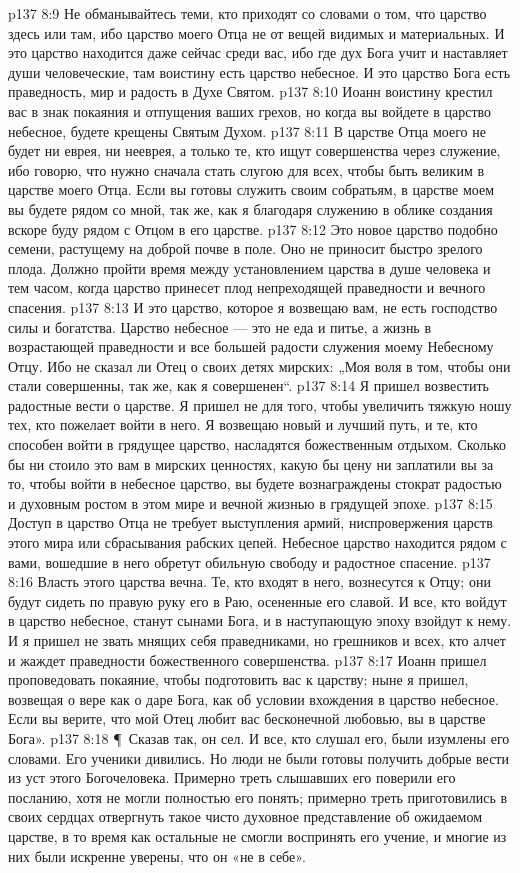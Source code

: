 \vs p137 8:9 Не обманывайтесь теми, кто приходят со словами о том, что царство здесь или там, ибо царство моего Отца не от вещей видимых и материальных. И это царство находится даже сейчас среди вас, ибо где дух Бога учит и наставляет души человеческие, там воистину есть царство небесное. И это царство Бога есть праведность, мир и радость в Духе Святом.
\vs p137 8:10 Иоанн воистину крестил вас в знак покаяния и отпущения ваших грехов, но когда вы войдете в царство небесное, будете крещены Святым Духом.
\vs p137 8:11 В царстве Отца моего не будет ни еврея, ни нееврея, а только те, кто ищут совершенства через служение, ибо говорю, что нужно сначала стать слугою для всех, чтобы быть великим в царстве моего Отца. Если вы готовы служить своим собратьям, в царстве моем вы будете рядом со мной, так же, как я благодаря служению в облике создания вскоре буду рядом с Отцом в его царстве.
\vs p137 8:12 Это новое царство подобно семени, растущему на доброй почве в поле. Оно не приносит быстро зрелого плода. Должно пройти время между установлением царства в душе человека и тем часом, когда царство принесет плод непреходящей праведности и вечного спасения.
\vs p137 8:13 И это царство, которое я возвещаю вам, не есть господство силы и богатства. Царство небесное --- это не еда и питье, а жизнь в возрастающей праведности и все большей радости служения моему Небесному Отцу. Ибо не сказал ли Отец о своих детях мирских: „Моя воля в том, чтобы они стали совершенны, так же, как я совершенен“.
\vs p137 8:14 Я пришел возвестить радостные вести о царстве. Я пришел не для того, чтобы увеличить тяжкую ношу тех, кто пожелает войти в него. Я возвещаю новый и лучший путь, и те, кто способен войти в грядущее царство, насладятся божественным отдыхом. Сколько бы ни стоило это вам в мирских ценностях, какую бы цену ни заплатили вы за то, чтобы войти в небесное царство, вы будете вознаграждены стократ радостью и духовным ростом в этом мире и вечной жизнью в грядущей эпохе.
\vs p137 8:15 Доступ в царство Отца не требует выступления армий, ниспровержения царств этого мира или сбрасывания рабских цепей. Небесное царство находится рядом с вами, вошедшие в него обретут обильную свободу и радостное спасение.
\vs p137 8:16 Власть этого царства вечна. Те, кто входят в него, вознесутся к Отцу; они будут сидеть по правую руку его в Раю, осененные его славой. И все, кто войдут в царство небесное, станут сынами Бога, и в наступающую эпоху взойдут к нему. И я пришел не звать мнящих себя праведниками, но грешников и всех, кто алчет и жаждет праведности божественного совершенства.
\vs p137 8:17 Иоанн пришел проповедовать покаяние, чтобы подготовить вас к царству; ныне я пришел, возвещая о вере как о даре Бога, как об условии вхождения в царство небесное. Если вы верите, что мой Отец любит вас бесконечной любовью, вы в царстве Бога».
\vs p137 8:18 \P\ Сказав так, он сел. И все, кто слушал его, были изумлены его словами. Его ученики дивились. Но люди не были готовы получить добрые вести из уст этого Богочеловека. Примерно треть слышавших его поверили его посланию, хотя не могли полностью его понять; примерно треть приготовились в своих сердцах отвергнуть такое чисто духовное представление об ожидаемом царстве, в то время как остальные не смогли воспринять его учение, и многие из них были искренне уверены, что он «не в себе».
